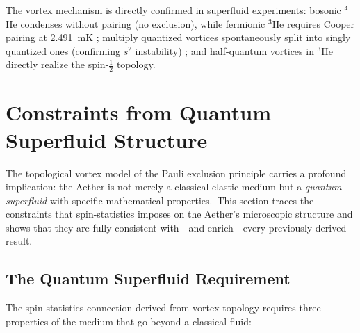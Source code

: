 ﻿\documentclass[12pt,letterpaper]{article}
\begin{document}
The vortex mechanism is directly confirmed in superfluid experiments:
bosonic $^4$He condenses without pairing (no exclusion), while fermionic
$^3$He requires Cooper pairing at 2.491~mK \cite{osheroff1972}; multiply
quantized vortices spontaneously split into singly quantized ones
(confirming $s^2$ instability) \cite{shin2004}; and half-quantum vortices
in $^3$He \cite{autti2016} directly realize the spin-$\tfrac{1}{2}$
topology.



\section{Constraints from Quantum Superfluid Structure}
\label{sec:qss}

The topological vortex model of the Pauli exclusion principle carries a profound
implication: the Aether is not merely a classical elastic medium but a
\emph{quantum superfluid} with specific mathematical properties.\ This section
traces the constraints that spin-statistics imposes on the Aether's microscopic
structure and shows that they are fully consistent with---and enrich---every
previously derived result.


\subsection{The Quantum Superfluid Requirement}

The spin-statistics connection derived from vortex topology requires three
properties of the medium that go beyond a classical fluid:
\end{document}
